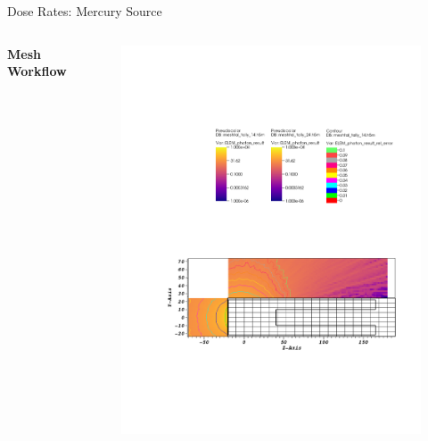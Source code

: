 \documentclass{beamer}
\begin{document}
\begin{frame}{Dose Rates: Mercury Source}
\begin{columns}[T]
        \textbf{Mesh Workflow}
        \begin{figure}
                \centering
                \includegraphics[scale=0.49,trim={2.5cm 6cm 1cm 15cm},clip]{figs/dose_mer_mesh_novoid.pdf}
        \end{figure}


\end{columns}
\end{frame}
\end{document}
